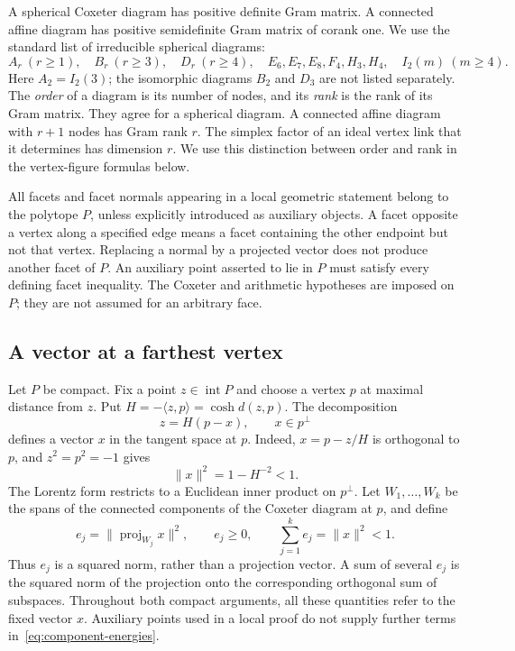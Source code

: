 \documentclass[11pt]{article}
\theoremstyle{definition}
\theoremstyle{remark}
\numberwithin{equation}{section}
\newcommand{\ip}[2]{\langle #1,#2\rangle}
\newcommand{\norm}[1]{\lVert #1\rVert}
\begin{document}
A spherical Coxeter diagram has positive definite Gram matrix. A
connected affine diagram has positive semidefinite Gram matrix of
corank one. We use the standard list of irreducible spherical diagrams:
\[
 A_r\ (r\ge1),\quad B_r\ (r\ge3),\quad D_r\ (r\ge4),\quad
 E_6,E_7,E_8,F_4,H_3,H_4,\quad I_2(m)\ (m\ge4).
\]
Here $A_2=I_2(3)$; the isomorphic diagrams $B_2$ and $D_3$ are not
listed separately. The \emph{order}
of a diagram is its number of nodes, and its \emph{rank} is the rank
of its Gram matrix. They agree for a spherical diagram. A connected
affine diagram with $r+1$ nodes has Gram rank $r$. The simplex factor
of an ideal vertex link that it determines has dimension $r$.
We use this distinction between order and rank in the vertex-figure
formulas below.

All facets and facet normals appearing in a local geometric
statement belong to the polytope $P$, unless explicitly introduced
as auxiliary objects. A facet opposite a vertex along a specified
edge means a facet containing the other endpoint but not that
vertex. Replacing a normal by a projected vector does not produce
another facet of $P$. An auxiliary point asserted to lie in $P$
must satisfy every defining facet inequality. The Coxeter and arithmetic hypotheses
are imposed on $P$; they are not assumed for an arbitrary face.

\subsection{A vector at a farthest vertex}

Let $P$ be compact. Fix a point $z\in\operatorname{int}P$ and choose
a vertex $p$ at maximal distance from $z$. Put
$H=-\ip{z}{p}=\cosh d(z,p)$.
The decomposition
\begin{equation}\label{eq:original-vector}
                   z=H(p-x),\qquad x\in p^\perp
\end{equation}
defines a vector $x$ in the tangent space at $p$. Indeed,
$x=p-z/H$ is orthogonal to $p$, and $z^2=p^2=-1$ gives
\begin{equation}\label{eq:original-budget}
                         \norm{x}^2=1-H^{-2}<1.
\end{equation}
The Lorentz form restricts to a Euclidean inner product on $p^\perp$.
Let $W_1,\ldots,W_k$ be the spans of the connected components of the
Coxeter diagram at $p$, and define
\begin{equation}\label{eq:component-energies}
 e_j=\norm{\operatorname{proj}_{W_j}x}^2,\qquad
 e_j\ge0,\qquad \sum_{j=1}^ke_j=\norm{x}^2<1.
\end{equation}
Thus $e_j$ is a squared norm, rather than a projection vector. A sum
of several $e_j$ is the squared norm of the projection onto the
corresponding orthogonal sum of subspaces. Throughout both compact
arguments, all these quantities refer to the fixed vector $x$.
Auxiliary points used in a local proof do not supply further terms
in~\eqref{eq:component-energies}.
\end{document}
